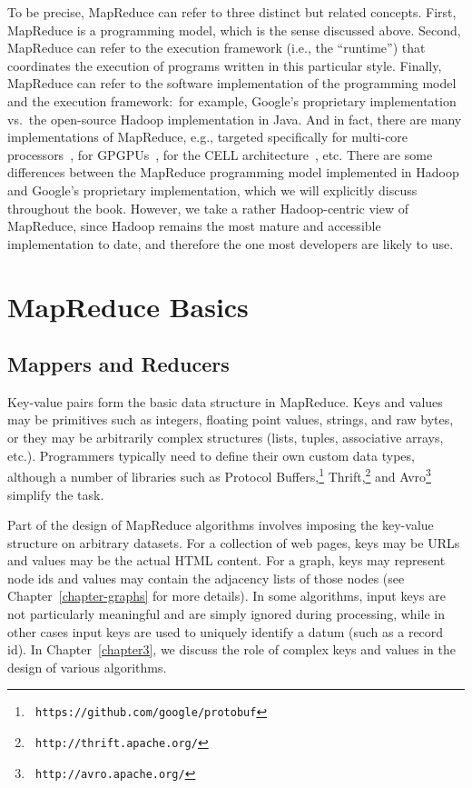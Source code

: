 \documentclass[11pt]{article}
\begin{document}
To be precise, MapReduce can refer to three distinct but related
concepts.  First, MapReduce is a programming model, which is the sense
discussed above.  Second, MapReduce can refer to the execution
framework (i.e., the ``runtime'') that coordinates the execution of
programs written in this particular style.  Finally, MapReduce can
refer to the software implementation of the programming model and the
execution framework:\ for example, Google's proprietary implementation
vs.\ the open-source Hadoop implementation in Java.  And in fact,
there are many implementations of MapReduce, e.g., targeted
specifically for multi-core processors~\cite{Ranger_etal_2007}, for
GPGPUs~\cite{HeB_etal_2008}, for the CELL
architecture~\cite{Rafique_etal_2009}, etc.  There are some
differences between the MapReduce programming model implemented in
Hadoop and Google's proprietary implementation, which we will
explicitly discuss throughout the book.  However, we take a rather
Hadoop-centric view of MapReduce, since Hadoop remains the most mature
and accessible implementation to date, and therefore the one most
developers are likely to use.

\section{MapReduce Basics}
\label{chapter2:mappers-and-reducers}

\subsection{Mappers and Reducers}

Key-value pairs form the basic data structure in MapReduce.  Keys and
values may be primitives such as integers, floating point values,
strings, and raw bytes, or they may be arbitrarily complex structures
(lists, tuples, associative arrays, etc.).  Programmers typically need
to define their own custom data types, although a number of libraries
such as Protocol Buffers,\footnote{\texttt{
https://github.com/google/protobuf}} Thrift,\footnote{\texttt{
http://thrift.apache.org/}} and Avro\footnote{\texttt{
http://avro.apache.org/}} simplify the task.

Part of the design of MapReduce algorithms involves imposing the
key-value structure on arbitrary datasets.  For a collection of web
pages, keys may be URLs and values may be the actual HTML content.
For a graph, keys may represent node ids and values may contain the
adjacency lists of those nodes (see Chapter~\ref{chapter-graphs} for
more details). In some algorithms, input keys are not particularly
meaningful and are simply ignored during processing, while in other
cases input keys are used to uniquely identify a datum (such as a
record id).  In Chapter~\ref{chapter3}, we discuss the role of complex
keys and values in the design of various algorithms.
\end{document}
